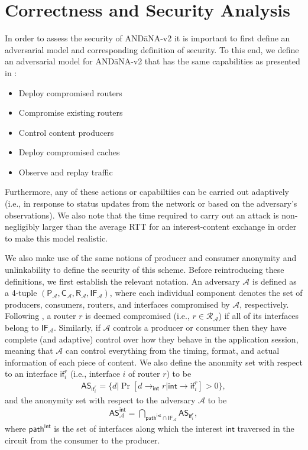 \documentclass[10pt]{article}
\begin{document}
\section{Correctness and Security Analysis}
In order to assess the security of {\sf AND\=aNA-v2} it is important to first define an adversarial model and corresponding definition of security. To this end, we define an adversarial model for {\sf AND\=aNA-v2} that has the same capabilities as presented in \cite{andana}:
\begin{itemize}
	\item Deploy compromised routers
	\item Compromise existing routers
	\item Control content producers
	\item Deploy compromised caches
	\item Observe and replay traffic
\end{itemize}
Furthermore, any of these actions or capabiltiies can be carried out adaptively (i.e., in response to status updates from the network or based on the adversary's observations). We also note that the time required to carry out an attack is non-negligibly larger than the average RTT for an interest-content exchange in order to make this model realistic. 

We also make use of the same notions of producer and consumer anonymity and unlinkability to define the security of this scheme. Before reintroducing these definitions, we first establish the relevant notation. An adversary $\mathcal{A}$ is defined as a 4-tuple $(\mathsf{P}_{\mathcal{A}}, \mathsf{C}_{\mathcal{A}}, \mathsf{R}_{\mathcal{A}}, \mathsf{IF}_{\mathcal{A}})$, where each individual component denotes the set of producers, consumers, routers, and interfaces compromised by $\mathcal{A}$, respectively. Following \cite{andana}, a router $r$ is deemed compromised (i.e., $r \in \mathcal{R}_{\mathcal{A}}$) if all of its interfaces belong to $\mathsf{IF}_{\mathcal{A}}$. Similarly, if $\mathcal{A}$ controls a producer or consumer then they have complete (and adaptive) control over how they behave in the application session, meaning that $\mathcal{A}$ can control everything from the timing, format, and actual information of each piece of content. We also define the anonmity set with respect to an interface $\mathsf{if}_i^r$ (i.e., interface $i$ of router $r$) to be 
\begin{align*}
\mathsf{AS}_{\mathsf{if}_{i}^{r}} = \{d | \Pr[d \to_\mathsf{int} r | \mathsf{int} \to \mathsf{if}_i^r] > 0 \},
\end{align*}
and the anonymity set with respect to the adversary $\mathcal{A}$ to be
\begin{align*}
\mathsf{AS}_{\mathcal{A}}^{\mathsf{int}} = \bigcap_{\mathsf{path}^{\mathsf{int}} \cap \mathsf{IF}_{\mathcal{A}}} \mathsf{AS}_{\mathsf{if}_{i}^{r}},
\end{align*}
where $\mathsf{path}^{\mathsf{int}}$ is the set of interfaces along which the interest $\mathsf{int}$ traversed in the circuit from the consumer to the producer. 
\end{document}
